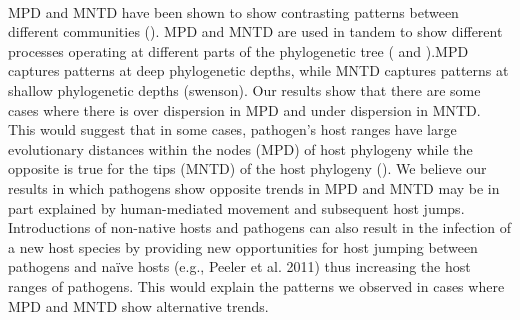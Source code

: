 \documentclass[12pt,letter]{article}
\begin{document}
\paragraph{}MPD and MNTD have been shown to show contrasting patterns between different communities (\cite{Mazel2016}). MPD and MNTD are used in tandem to show different processes operating at different parts of the phylogenetic tree (\cite{Kembel2010} and \cite{Mazel2016}).MPD captures patterns at deep phylogenetic depths, while MNTD captures patterns at shallow phylogenetic depths (swenson). Our results show that there are some cases where there is over dispersion in MPD and under dispersion in MNTD. This would suggest that in some cases, pathogen's host ranges have large evolutionary distances within the nodes (MPD) of host phylogeny while the opposite is true for the tips (MNTD) of the host phylogeny (\cite{Tsirogiannis2013}). We believe our results in which pathogens show opposite trends in MPD and MNTD may be in part explained by human-mediated movement and subsequent host jumps. Introductions of non-native hosts and pathogens can also result in the infection of a new host species by providing new opportunities for host jumping between pathogens and naïve hosts (e.g., Peeler et al. 2011) thus increasing the host ranges of pathogens. This would explain the patterns we observed in cases where MPD and MNTD show alternative trends. 
\end{document}
